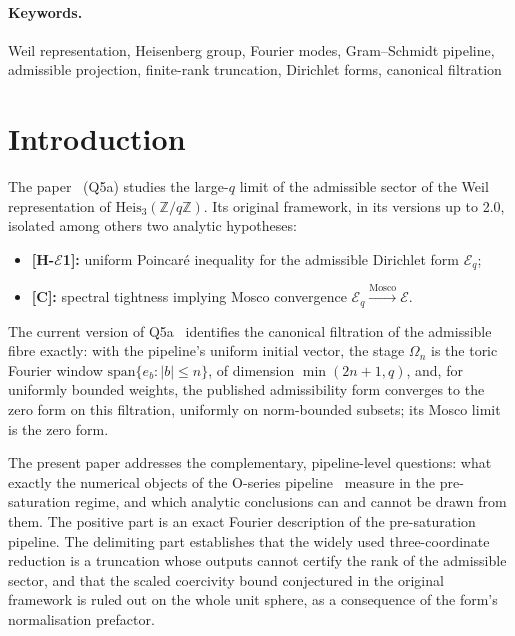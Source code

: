 \documentclass[11pt,a4paper]{article}
\theoremstyle{plain}
\theoremstyle{definition}
\newcommand{\Z}{\mathbb{Z}}
\newcommand{\Heis}{\mathrm{Heis}_3}
\newcommand{\Eq}{\mathcal{E}_q}
\begin{document}
  \paragraph{Keywords.}
    Weil representation, Heisenberg group, Fourier modes, Gram--Schmidt pipeline,
    admissible projection, finite-rank truncation, Dirichlet forms, canonical filtration

    \newpage
    \tableofcontents
    \newpage

  \section{Introduction}
  \label{sec:intro}

  The paper~\cite{Beau2026q5a} (Q5a) studies the large-$q$ limit of the admissible
  sector of the Weil representation of $\Heis(\Z/q\Z)$.
  Its original framework, in its versions up to 2.0, isolated among others two analytic
  hypotheses:
  \begin{itemize}
    \item \textbf{[H-$\mathcal{E}$1]:} uniform Poincar\'e inequality for the
    admissible Dirichlet form $\Eq$;
    \item \textbf{[C]:} spectral tightness implying Mosco convergence
    $\Eq \xrightarrow{\mathrm{Mosco}} \mathcal{E}$.
  \end{itemize}
  The current version of Q5a~\cite{Beau2026q5a} identifies the canonical filtration of
  the admissible fibre exactly: with the pipeline's uniform initial vector, the stage
  $\Omega_n$ is the toric Fourier window
  $\mathrm{span}\{e_b : |b| \le n\}$, of dimension $\min(2n+1, q)$, and, for uniformly
  bounded weights, the published admissibility form converges to the zero form on this
  filtration, uniformly on norm-bounded subsets; its Mosco limit is the zero form.

  The present paper addresses the complementary, pipeline-level questions: what exactly
  the numerical objects of the O-series pipeline~\cite{Beau2026a29} measure in the
  pre-saturation regime, and which analytic conclusions can and cannot be drawn from
  them.
  The positive part is an exact Fourier description of the pre-saturation pipeline.
  The delimiting part establishes that the widely used three-coordinate reduction is a
  truncation whose outputs cannot certify the rank of the admissible sector, and that the
  scaled coercivity bound conjectured in the original framework is ruled out on the whole
  unit sphere, as a consequence of the form's normalisation prefactor.
\end{document}
